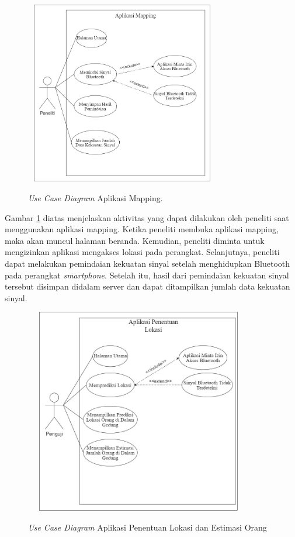 \begin{figure}[H]
	\center
	\shadowbox
	{\includegraphics [width=8.5cm, height=8cm]{gambar/mapping}}
	\caption{\textit{Use Case Diagram} Aplikasi Mapping.}
	\label{usecasemapping}
\end{figure}

\par Gambar \ref{usecasemapping} diatas menjelaskan aktivitas yang dapat dilakukan oleh peneliti saat menggunakan aplikasi mapping. Ketika peneliti membuka aplikasi mapping, maka akan muncul halaman beranda. Kemudian, peneliti diminta untuk mengizinkan aplikasi mengakses lokasi pada perangkat. Selanjutnya, peneliti dapat melakukan pemindaian kekuatan sinyal setelah menghidupkan Bluetooth pada perangkat \textit{smartphone}. Setelah itu, hasil dari pemindaian kekuatan sinyal tersebut disimpan didalam server dan dapat ditampilkan jumlah data kekuatan sinyal.
\fancyhf{}
\fancyfoot[R]{\thepage}

\begin{figure}[H]
	\center
	\shadowbox
	{\includegraphics [width=10cm, height=9cm]{gambar/penentuanlokasi}}
	\caption{\textit{Use Case Diagram} Aplikasi Penentuan Lokasi dan Estimasi Orang}
	\label{usecaseuser}
\end{figure}

